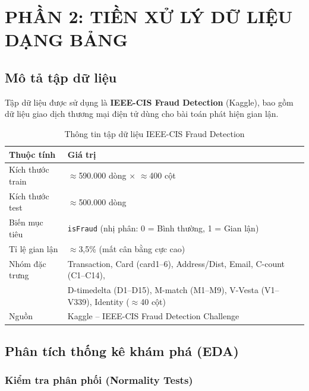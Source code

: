 \documentclass[12pt,a4paper]{article}
\let\oldtextbf\textbf
\renewcommand{\textbf}[1]{\oldtextbf{\textcolor{hcmublue}{#1}}}
\begin{document}
\section{PHẦN 2: TIỀN XỬ LÝ DỮ LIỆU DẠNG BẢNG}

\subsection{Mô tả tập dữ liệu}

Tập dữ liệu được sử dụng là \textbf{IEEE-CIS Fraud Detection} (Kaggle), bao gồm dữ liệu giao dịch thương mại điện tử dùng cho bài toán phát hiện gian lận.

\begin{table}[H]
\centering
\begin{tabular}{|l|l|}
\hline
\textbf{Thuộc tính} & \textbf{Giá trị} \\ \hline
Kích thước train & $\approx$590.000 dòng $\times$ $\approx$400 cột \\ \hline
Kích thước test  & $\approx$500.000 dòng \\ \hline
Biến mục tiêu    & \texttt{isFraud} (nhị phân: 0 = Bình thường, 1 = Gian lận) \\ \hline
Tỉ lệ gian lận   & $\approx$3,5\% (mất cân bằng cực cao) \\ \hline
Nhóm đặc trưng   & Transaction, Card (card1--6), Address/Dist, Email, C-count (C1--C14), \\ 
                 & D-timedelta (D1--D15), M-match (M1--M9), V-Vesta (V1--V339), Identity ($\approx$40 cột) \\ \hline
Nguồn            & Kaggle -- IEEE-CIS Fraud Detection Challenge \\ \hline
\end{tabular}
\caption{Thông tin tập dữ liệu IEEE-CIS Fraud Detection}
\label{tab:tabular_dataset}
\end{table}

\subsection{Phân tích thống kê khám phá (EDA)}

\subsubsection{Kiểm tra phân phối (Normality Tests)}
\end{document}
